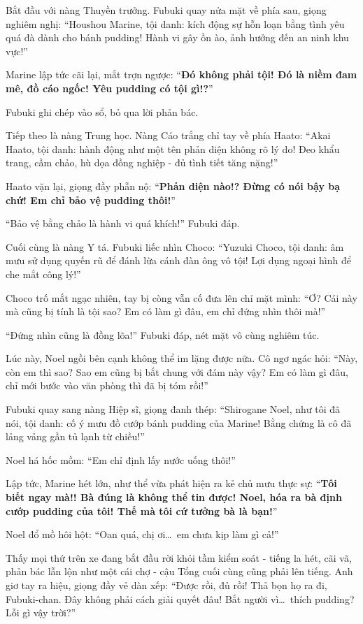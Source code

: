 \documentclass[../main.tex]{subfiles}
\begin{document}
Bắt đầu với nàng Thuyền trưởng. Fubuki quay nửa mặt về phía sau, giọng nghiêm nghị: ``Houshou Marine, tội danh: kích động sự hỗn loạn bằng tình yêu quá đà dành cho bánh pudding! Hành vi gây ồn ào, ảnh hưởng đến an ninh khu vực!''

Marine lập tức cãi lại, mắt trợn ngược: ``\textbf{Đó không phải tội! Đó là niềm đam mê, đồ cáo ngốc! Yêu pudding có tội gì!?}''

Fubuki ghi chép vào sổ, bỏ qua lời phản bác.

Tiếp theo là nàng Trung học. Nàng Cáo trắng chỉ tay về phía Haato: ``Akai Haato, tội danh: hành động như một tên phản diện không rõ lý do! Đeo khẩu trang, cầm chảo, hù dọa đồng nghiệp - đủ tình tiết tăng nặng!''

Haato vặn lại, giọng đầy phẫn nộ: ``\textbf{Phản diện nào!? Đừng có nói bậy bạ chứ! Em chỉ bảo vệ pudding thôi!}''

``Bảo vệ bằng chảo là hành vi quá khích!'' Fubuki đáp.

Cuối cùng là nàng Y tá. Fubuki liếc nhìn Choco: ``Yuzuki Choco, tội danh: âm mưu sử dụng quyến rũ để đánh lừa cánh đàn ông vô tội! Lợi dụng ngoại hình để che mắt công lý!''

Choco trố mắt ngạc nhiên, tay bị còng vẫn cố đưa lên chỉ mặt mình: ``Ơ? Cái này mà cũng bị tính là tội sao? Em có làm gì đâu, em chỉ đứng nhìn thôi mà!''

``Đứng nhìn cũng là đồng lõa!'' Fubuki đáp, nét mặt vô cùng nghiêm túc.

Lúc này, Noel ngồi bên cạnh không thể im lặng được nữa. Cô ngơ ngác hỏi: ``Này, còn em thì sao? Sao em cũng bị bắt chung với đám này vậy? Em có làm gì đâu, chỉ mới bước vào văn phòng thì đã bị tóm rồi!''

Fubuki quay sang nàng Hiệp sĩ, giọng đanh thép: ``Shirogane Noel, như tôi đã nói, tội danh: cố ý mưu đồ cướp bánh pudding của Marine! Bằng chứng là cô đã lảng vảng gần tủ lạnh từ chiều!''

Noel há hốc mồm: ``Em chỉ định lấy nước uống thôi!''

Lập tức, Marine hét lớn, như thể vừa phát hiện ra kẻ chủ mưu thực sự: ``\textbf{Tôi biết ngay mà!! Bà đúng là không thể tin được! Noel, hóa ra bà định cướp pudding của tôi! Thế mà tôi cứ tưởng bà là bạn!}''

Noel đổ mồ hôi hột: ``Oan quá, chị ơi\dots\ em chưa kịp làm gì cả!''

Thấy mọi thứ trên xe đang bắt đầu rời khỏi tầm kiểm soát - tiếng la hét, cãi vã, phản bác lẫn lộn như một cái chợ - cậu Tổng cuối cùng cũng phải lên tiếng. Anh giơ tay ra hiệu, giọng đầy vẻ dàn xếp: ``Được rồi, đủ rồi! Thả bọn họ ra đi, Fubuki-chan. Đây không phải cách giải quyết đâu! Bắt người vì\dots\ thích pudding? Lỗi gì vậy trời?''
\end{document}
